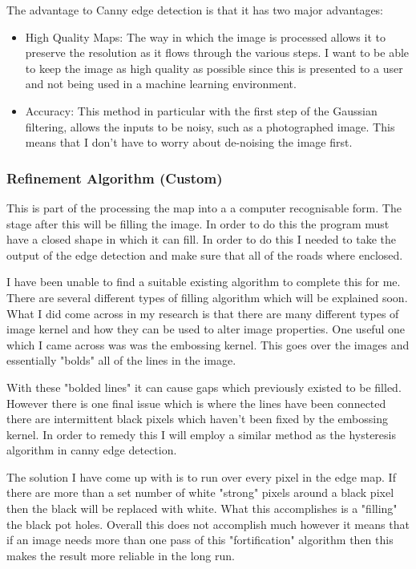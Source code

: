 \begin{FlushLeft}
    The advantage to Canny edge detection is that it has two major advantages:
    \begin{itemize}
        \item High Quality Maps: The way in which the image is processed allows it to preserve the resolution as it flows through the various steps. I want to be able to keep the image as high quality as possible since this is presented to a user and not being used in a machine learning environment.
        \item Accuracy: This method in particular with the first step of the Gaussian filtering, allows the inputs to be noisy, such as a photographed image. This means that I don't have to worry about de-noising the image first. 
    \end{itemize}

    \bk

    \subsubsection{Refinement Algorithm (Custom)}
    This is part of the processing the map into a a computer recognisable form. The stage after this will be filling the image. In order to do this the program must have a closed shape in which it can fill. In order to do this I needed to take the output of the edge detection and make sure that all of the roads where enclosed. \\ \bk

    I have been unable to find a suitable existing algorithm to complete this for me. There are several different types of filling algorithm which will be explained soon. What I did come across in my research is that there are many different types of image kernel and how they can be used to alter image properties. One useful one which I came across was was the embossing kernel. This goes over the images and essentially "bolds" all of the lines in the image. \\ \bk

    With these "bolded lines" it can cause gaps which previously existed to be filled. However there is one final issue which is where the lines have been connected there are intermittent black pixels which haven't been fixed by the embossing kernel. In order to remedy this I will employ a similar method as the hysteresis algorithm in canny edge detection. \\ \bk
    
    The solution I have come up with is to run over every pixel in the edge map. If there are more than a set number of white "strong" pixels around a black pixel then the black will be replaced with white. What this accomplishes is a "filling" the black pot holes. Overall this does not accomplish much however it means that if an image needs more than one pass of this "fortification" algorithm then this makes the result more reliable in the long run. \\ \bk


\end{FlushLeft}
